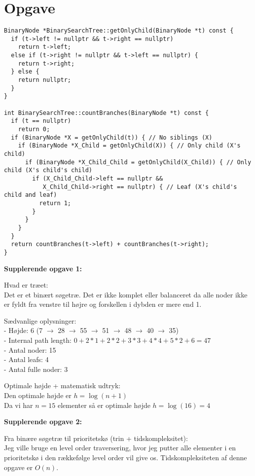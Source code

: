 \documentclass{article}
\begin{document}
\section{Opgave} %
\begin{verbatim}
BinaryNode *BinarySearchTree::getOnlyChild(BinaryNode *t) const {
  if (t->left != nullptr && t->right == nullptr)
    return t->left;
  else if (t->right != nullptr && t->left == nullptr) {
    return t->right;
  } else {
    return nullptr;
  }
}

int BinarySearchTree::countBranches(BinaryNode *t) const {
  if (t == nullptr)
    return 0;
  if (BinaryNode *X = getOnlyChild(t)) { // No siblings (X)
    if (BinaryNode *X_Child = getOnlyChild(X)) { // Only child (X's child)
      if (BinaryNode *X_Child_Child = getOnlyChild(X_Child)) { // Only child (X's child's child)
        if (X_Child_Child->left == nullptr && 
           X_Child_Child->right == nullptr) { // Leaf (X's child's child and leaf)
          return 1;
        }
      }
    }
  }
  return countBranches(t->left) + countBranches(t->right);
}
\end{verbatim}

\textbf{Supplerende opgave 1:}

Hvad er træet:\\
Det er et binært søgetræ. Det er ikke komplet eller balanceret da 
alle noder ikke er fyldt fra venstre til højre og forskellen i dybden er 
mere end 1.

Sædvanlige oplysninger:\\
- Højde: 6 (7 $\to$ 28 $\to$ 55 $\to$ 51 $\to$ 48 $\to$ 40 $\to$ 35)\\
- Internal path length: $0 + 2 * 1 + 2 * 2 + 3 * 3 + 4 * 4 + 5 * 2 + 6 = 47$\\
- Antal noder: 15\\
- Antal leafs: 4\\
- Antal fulle noder: 3

Optimale højde + matematisk udtryk:\\
Den optimale højde er $h = \log{(n + 1)}$\\
Da vi har $n=15$ elementer så er optimale højde $h = \log{(16)}=4$

\textbf{Supplerende opgave 2:}

Fra binære søgetræ til prioritetskø (trin + tidskompleksitet):\\
Jeg ville bruge en level order traversering, hvor jeg putter alle elementer i en
prioritetskø i den rækkefølge level order vil give os. Tidskompleksiteten af
denne opgave er $O(n)$.
\end{document}
